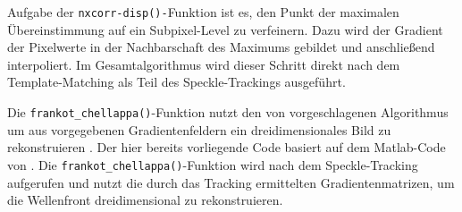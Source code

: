 Aufgabe der \texttt{nxcorr-disp()-}Funktion ist es, den Punkt der maximalen Übereinstimmung auf ein Subpixel-Level zu verfeinern. Dazu wird der Gradient der Pixelwerte in der Nachbarschaft des Maximums gebildet und anschließend interpoliert. Im Gesamtalgorithmus wird dieser Schritt direkt nach dem Template-Matching als Teil des Speckle-Trackings ausgeführt.

\begin{sloppypar}
	Die \texttt{frankot\_chellappa()}-Funktion nutzt den von \citeauthor{FC88} vorgeschlagenen Algorithmus um aus vorgegebenen Gradientenfeldern ein dreidimensionales Bild zu rekonstruieren \cite{FC88}. Der hier bereits vorliegende Code basiert auf dem Matlab-Code von \citeauthor{Kov04} \cite{Kov04}. Die \texttt{frankot\_chellappa()}-Funktion wird nach dem Speckle-Tracking aufgerufen und nutzt die durch das Tracking ermittelten Gradientenmatrizen, um die Wellenfront dreidimensional zu rekonstruieren. 
\end{sloppypar}
